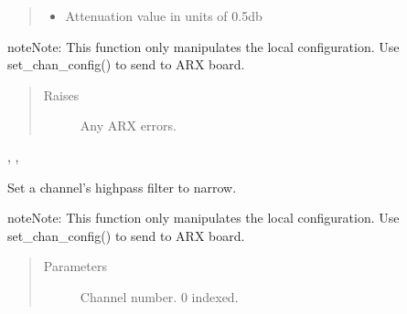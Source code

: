 \documentclass[letterpaper,10pt,english]{sphinxmanual}
\begin{document}
\begin{fulllineitems}
\begin{fulllineitems}
\begin{quote}
\begin{description}
\begin{itemize}
\item {} 
 \textendash{} Attenuation value in units of 0.5db

\end{itemize}

\end{description}\end{quote}

\begin{sphinxadmonition}{note}{Note:}
This function only manipulates the local configuration.
Use set\_chan\_config() to send to ARX board.
\end{sphinxadmonition}
\begin{quote}\begin{description}
\item[{Raises}] \leavevmode
{} \textendash{} Any ARX errors.

\end{description}\end{quote}




{\hyperref[\detokenize{index:lwautils.lwa_arx.ARX.show_chan_cfg}]{}}, {\hyperref[\detokenize{index:lwautils.lwa_arx.ARX.set_chan_cfg}]{}}, {\hyperref[\detokenize{index:lwautils.lwa_arx.ARX.set_chan_cfg_second_atten}]{}}



\end{fulllineitems}


\begin{fulllineitems}
\label{\detokenize{index:lwautils.lwa_arx.ARX.set_chan_cfg_highpass_narrow}}
Set a channel’s highpass filter to narrow.

\begin{sphinxadmonition}{note}{Note:}
This function only manipulates the local configuration.
Use set\_chan\_config() to send to ARX board.
\end{sphinxadmonition}
\begin{quote}\begin{description}
\item[{Parameters}] \leavevmode
{} \textendash{} Channel number. 0 indexed.


\end{description}
\end{quote}
\end{fulllineitems}
\end{fulllineitems}
\end{document}
